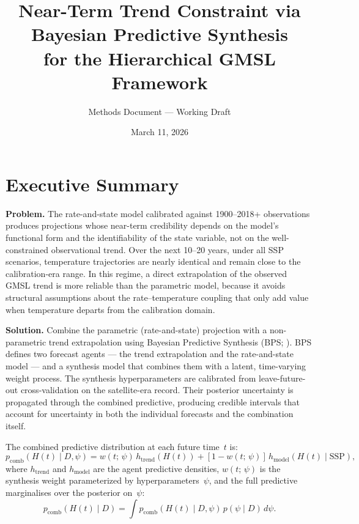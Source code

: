 \documentclass[11pt]{article}
\title{Near-Term Trend Constraint via Bayesian Predictive Synthesis\\
  for the Hierarchical GMSL Framework}
\author{Methods Document --- Working Draft}
\date{March 11, 2026}
\begin{document}
\maketitle

\section{Executive Summary}

\textbf{Problem.}  The rate-and-state model calibrated against 1900--2018+ observations produces projections whose near-term credibility depends on the model's functional form and the identifiability of the state variable, not on the well-constrained observational trend.  Over the next 10--20 years, under all SSP scenarios, temperature trajectories are nearly identical and remain close to the calibration-era range.  In this regime, a direct extrapolation of the observed GMSL trend is more reliable than the parametric model, because it avoids structural assumptions about the rate--temperature coupling that only add value when temperature departs from the calibration domain.

\textbf{Solution.}  Combine the parametric (rate-and-state) projection with a non-parametric trend extrapolation using Bayesian Predictive Synthesis (BPS; \citealt{McAlinn2019}).  BPS defines two forecast agents --- the trend extrapolation and the rate-and-state model --- and a synthesis model that combines them with a latent, time-varying weight process.  The synthesis hyperparameters are calibrated from leave-future-out cross-validation on the satellite-era record.  Their posterior uncertainty is propagated through the combined predictive, producing credible intervals that account for uncertainty in both the individual forecasts and the combination itself.

The combined predictive distribution at each future time~$t$ is:
\begin{equation}
  p_{\mathrm{comb}}(H(t) \mid D, \psi) = w(t;\,\psi)\,h_{\mathrm{trend}}(H(t)) + [1 - w(t;\,\psi)]\,h_{\mathrm{model}}(H(t) \mid \mathrm{SSP}),
  \label{eq:bps_predictive}
\end{equation}
where $h_{\mathrm{trend}}$ and $h_{\mathrm{model}}$ are the agent predictive densities, $w(t;\,\psi)$ is the synthesis weight parameterized by hyperparameters~$\psi$, and the full predictive marginalises over the posterior on~$\psi$:
\begin{equation}
  p_{\mathrm{comb}}(H(t) \mid D) = \int p_{\mathrm{comb}}(H(t) \mid D, \psi)\,p(\psi \mid D)\,d\psi.
  \label{eq:bps_marginal}
\end{equation}
\end{document}
